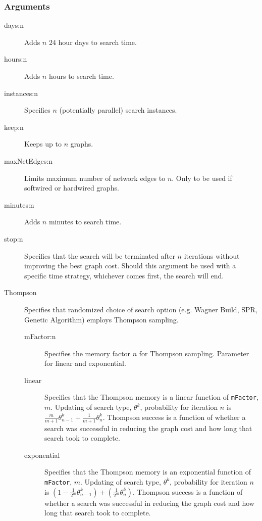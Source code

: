 	\subsubsection{Arguments}
	\begin{description}
		\item[days:n] Adds $n$ 24 hour days to search time.
		
		\item[hours:n] Adds $n$ hours to search time.
		
		\item[instances:n] Specifies $n$ (potentially parallel) search instances.
		
		\item[keep:n] Keeps up to $n$ graphs.
		
		\item[maxNetEdges:n] Limits maximum number of network edges to $n$. Only to be used if
		softwired or hardwired graphs.
		
		\item[minutes:n] Adds $n$ minutes to search time.
		
		
		\item[stop:n] Specifies that the search will be terminated after $n$ iterations without 
		improving the best graph cost. Should this argument be used with a specific time strategy, 
		whichever comes first, the search will end.
		
		\item[Thompson] Specifies that randomized choice of search option (e.g. Wagner 
		Build, SPR, Genetic Algorithm) 
		employs Thompson sampling.
		\begin{description}
			\item[mFactor:n] Specifies the memory factor $n$ for Thompson sampling. Parameter
			for linear and exponential.
		
			\item[linear] Specifies that the Thompson memory is a linear function of \texttt{mFactor}, 
			$m$.  Updating of search type, $\theta^k$, probability for iteration $n$ is $\frac{m}{m+1} 
			\theta^k_{n-1} + \frac{1}{m+1} \theta^k_n$.  Thompson success is a function of whether 
			a search was successful in reducing the graph cost and how long that search took to 
			complete.
		
			\item[exponential] Specifies that the Thompson memory is an exponential function of 
			\texttt{mFactor}, $m$.  Updating of search type, $\theta^k$, probability for iteration 
			$n$ is $ \left(1 - \frac{1}{2^m} \theta^k_{n-1}\right) + \left(\frac{1}{2^m} \theta^k_n \right)$.  
			Thompson success is a function of whether a search was successful in reducing the graph 
			cost and how long that search took to complete.
		\end{description}	

	\end{description}
		
